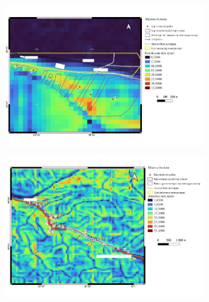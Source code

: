 \begin{figure}[H]
	\centering
	\includegraphics[width=0.8\textwidth]{media/ict2/image219}
	\caption*{}
\end{figure}

\begin{figure}[H]
	\centering
	\includegraphics[width=0.8\textwidth]{media/ict2/image220}
	\caption*{}
\end{figure}

